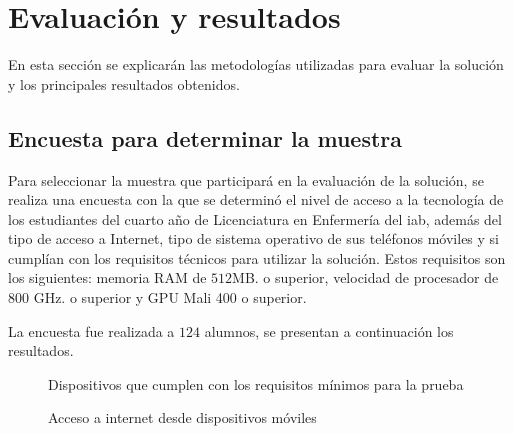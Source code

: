 \section{Evaluación y resultados}

En esta sección se explicarán las metodologías utilizadas para 
evaluar la solución y los principales resultados obtenidos.


\subsection{Encuesta para determinar la muestra}
\label{encuesta_muestra}

Para seleccionar la muestra que participará en la evaluación de la 
solución, se realiza una encuesta con la que se determinó el nivel de
acceso a la tecnología de los estudiantes del cuarto año de Licenciatura en
Enfermería del \gls{iab}, además del tipo de acceso a Internet, tipo de sistema
operativo de sus teléfonos móviles y si cumplían con los requisitos técnicos
para utilizar la solución. Estos requisitos son los siguientes:  memoria RAM de
$512$MB. o superior, velocidad de procesador de $800$ GHz. o superior y GPU Mali
400 o superior. 

La encuesta fue realizada a $124$ alumnos, se presentan a continuación los
resultados.

\begin{figure}[H]
\centering
{}
\caption{Dispositivos que cumplen con los requisitos mínimos para la prueba}
\label{fig:ubicacion_requisitos_minimos}
\end{figure}

\begin{figure}
\centering
{}
\caption{Acceso a internet desde dispositivos móviles}
\label{fig:ubicacion_acceso_internet}
\end{figure}

